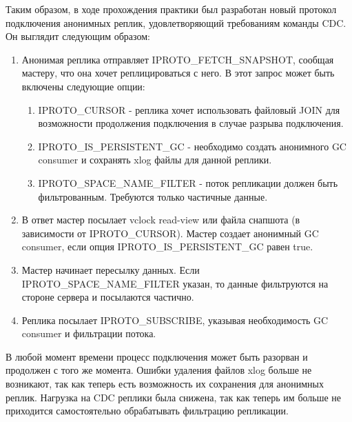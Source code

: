 \conclusion

Таким образом, в ходе прохождения практики был разработан новый протокол подключения анонимных реплик, удовлетворяющий требованиям команды CDC. Он выглядит следующим образом:

\begin{enumerate}
    \item Анонимая реплика отправляет IPROTO\_FETCH\_SNAPSHOT, сообщая мастеру, что она хочет реплицироваться с него. В этот запрос может быть включены следующие опции:
    \begin{enumerate}
        \item IPROTO\_CURSOR - реплика хочет использовать файловый JOIN для возможности продолжения подключения в случае разрыва подключения.
        \item IPROTO\_IS\_PERSISTENT\_GC - необходимо создать анонимного GC consumer и сохранять xlog файлы для данной реплики.
        \item IPROTO\_SPACE\_NAME\_FILTER - поток репликации должен быть фильтрованным. Требуются только частичные данные.
    \end{enumerate}
    \item В ответ мастер посылает vclock read-view или файла снапшота (в зависимости от IPROTO\_CURSOR). Мастер создает анонимный GC consumer, если опция IPROTO\_IS\_PERSISTENT\_GC равен true.
    \item Мастер начинает пересылку данных. Если IPROTO\_SPACE\_NAME\_FILTER указан, то данные фильтруются на стороне сервера и посылаются частично.
    \item Реплика посылает IPROTO\_SUBSCRIBE, указывая необходимость GC consumer и фильтрации потока.
\end{enumerate}

В любой момент времени процесс подключения может быть разорван и продолжен с того же момента. Ошибки удаления файлов xlog больше не возникают, так как теперь есть возможность их сохранения для анонимных реплик. Нагрузка на CDC реплики была снижена, так как теперь им больше не приходится самостоятельно обрабатывать фильтрацию репликации.
